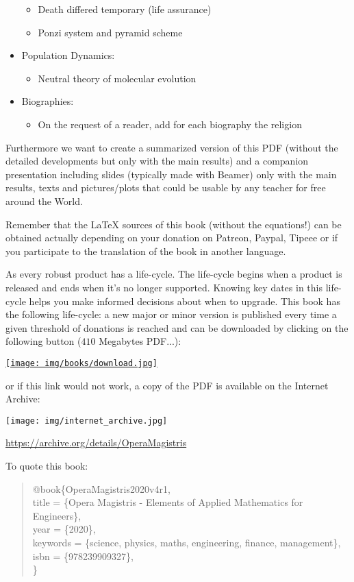 \begin{itemize}
\begin{itemize}
				\item Death differed temporary (life assurance)
				\item Ponzi system and pyramid scheme
			\end{itemize}
		\item Population Dynamics: 
			\begin{itemize}
				\item Neutral theory of molecular evolution
			\end{itemize}
		\item Biographies: 
			\begin{itemize}
				\item On the request of a reader, add for each biography the religion
			\end{itemize}
	\end{itemize}
	Furthermore we want to create a summarized version of this PDF (without the detailed developments but only with the main results) and a companion presentation including slides (typically made with Beamer) only with the main results, texts and pictures/plots that could be usable by any teacher for free around the World.
	
	Remember that the \LaTeX{} sources of this book (without the equations!) can be obtained actually depending on your donation on Patreon, Paypal, Tipeee or if you participate to the translation of the book in another language.
	
	As every robust product has a life-cycle. The life-cycle begins when a product is released and ends when it's no longer supported. Knowing key dates in this life-cycle helps you make informed decisions about when to upgrade. This book has the following life-cycle: a new major or minor version is published every time a given threshold of donations is reached and can be downloaded by clicking on the following button ($410$ Megabytes PDF...):
	\begin{center}
		\href{http://www.sciences.ch/htmlfr/php/cliccount/click.php?id=317}{\texttt{[image: img/books/download.jpg]}}
	\end{center}
	or if this link would not work, a copy of the PDF is available on the Internet Archive:
	\begin{center}
		\texttt{[image: img/internet\_archive.jpg]}
	\end{center}
	\begin{center}
	\href{https://archive.org/details/OperaMagistris}{https://archive.org/details/OperaMagistris}
	\end{center}
	
	\pagebreak
	To quote this book:
	\begin{quote}
	\noindent @book\{OperaMagistris2020v4r1, \\
		  title =        \{Opera Magistris - Elements of Applied Mathematics for Engineers\}, \\
		  year =         \{2020\}, \\
		  keywords =     \{science, physics, maths, engineering, finance, management\}, \\
		  isbn =          \{978239909327\},\\
	\}
	\end{quote}